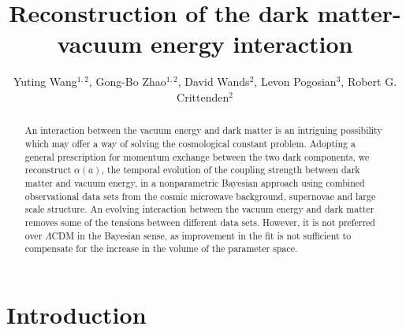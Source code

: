 \documentclass[prd,twocolumn,preprintnumbers,amsmath,amssymb,nofootinbib,english,showpacs]{revtex4-1}
\begin{document}
\title{Reconstruction of the dark matter-vacuum energy interaction}

\author{Yuting Wang$^{1,2}$, Gong-Bo Zhao$^{1,2}$, David Wands$^{2}$, Levon Pogosian$^{3}$, Robert G. Crittenden$^{2}$}




\begin{abstract}

An interaction between the vacuum energy and dark matter is an intriguing possibility which may offer a way of solving the cosmological constant problem. Adopting a general prescription for momentum exchange between the two dark components, we reconstruct $\alpha(a)$, the temporal evolution of the coupling strength between dark matter and vacuum energy, in a nonparametric Bayesian approach using combined observational data sets from the cosmic microwave background, supernovae and large scale structure. An evolving interaction between the vacuum energy and dark matter removes some of the tensions between different data sets. However, it is not preferred over $\Lambda$CDM in the Bayesian sense, as improvement in the fit is not sufficient to compensate for the increase in the volume of the parameter space.
\end{abstract}


\maketitle

\section{Introduction}
\end{document}
